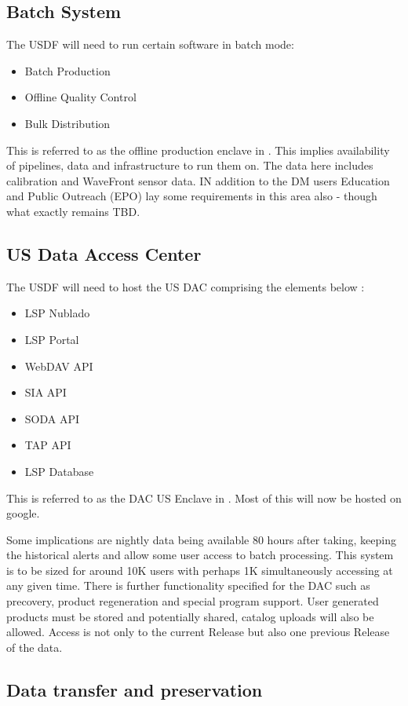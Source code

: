 \subsection{Batch System} \label{sec:offlineprod}

The USDF will need to run certain software in batch mode:
\begin{itemize}
\item Batch Production
\item Offline Quality Control
\item Bulk Distribution
\end{itemize}
This is referred to as the offline production  enclave in \cite{DMTN-104}.
This implies availability of pipelines, data and infrastructure to run them on.
The data here includes calibration and WaveFront sensor data.
IN addition to the DM users Education and Public Outreach (EPO) lay some requirements in this area also - though what exactly remains TBD.


\subsection{US Data Access Center}
The USDF will need to host the US DAC comprising the elements below :
\begin{itemize}
\item LSP Nublado
\item LSP Portal
\item WebDAV API
\item SIA API
\item SODA API
\item TAP API
\item LSP Database
\end{itemize}
This is referred to as the DAC US Enclave in \cite{DMTN-104}.
Most of this will now be hosted on google.

Some implications are nightly data being available 80 hours after taking, keeping the historical alerts and allow some user access to batch processing.
This system is to be sized for around 10K users with perhaps 1K simultaneously accessing at any given time.
There is further functionality specified for the DAC such as precovery, product regeneration and special program support.
User generated products must be stored and potentially shared, catalog uploads will also be allowed.
Access is not only to the current Release but also one previous Release of the data.

\subsection{Data transfer and preservation} \label{req:dbb}

